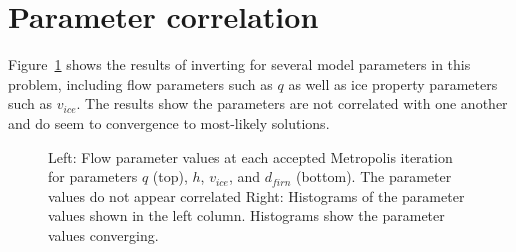 





\section{Parameter correlation}\label{sec:ke}



Figure~\ref{fig:flowparamconvergence} shows the results of inverting for several model parameters in this problem, including flow parameters such as $q$ as well as ice property parameters such as $v_{ice}$. The results show the parameters are not correlated with one another and do seem to convergence to most-likely solutions.

\begin{figure}[ht]
\centering
{}
\caption[]{Left: Flow parameter values at each accepted Metropolis iteration for parameters $q$ (top), $h$, $v_{ice}$, and $d_{firn}$ (bottom). The parameter values do not appear correlated Right: Histograms of the parameter values shown in the left column. Histograms show the parameter values converging.}
\label{fig:flowparamconvergence}
\end{figure}

